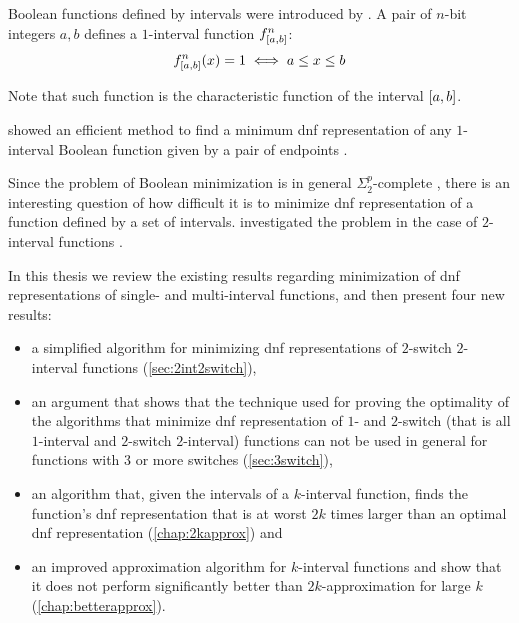 Boolean functions defined by intervals were introduced
by \citet{Schieber2005154}.
A pair of $n$-bit integers $a, b$
defines a $1$-interval function
$f^{n}_{[a, b]}$:
$$
f^{n}_{[a, b]} (x) = 1
\iff a \leq x \leq b
$$

Note that such function
is the characteristic function of the interval
$[a, b]$.

\citeauthor{Schieber2005154} showed an efficient method
to find a minimum \acrfull{dnf} representation
of any $1$-interval Boolean function
given by a pair of endpoints \citep{Schieber2005154}.

Since the problem of Boolean minimization is in general
$\Sigma_2^p$-complete \citep{Umans1998},
there is an interesting question of how difficult it is
to minimize \acrshort{dnf} representation of
a function defined by a set of intervals.
\citeauthor{Dubovsky2012} investigated the problem
in the case of $2$-interval functions
\citep{Dubovsky2012}.

In this thesis we review the existing results regarding
minimization of \acrshort{dnf} representations of
single- and multi-interval functions,
and then present four new results:

\begin{itemize}
\item a simplified algorithm
for minimizing \acrshort{dnf} representations
of $2$-switch
$2$-interval functions (\cref{sec:2int2switch}),

\item
an argument that shows
that the technique used for proving the optimality
of the algorithms that minimize
\acrshort{dnf} representation
of $1$- and $2$-switch
(that is all $1$-interval
and $2$-switch $2$-interval)
functions
can not be used in general for
functions with $3$ or more switches
(\cref{sec:3switch}),

\item
an algorithm
that,
given the intervals of a $k$-interval function,
finds the function's \acrshort{dnf} representation
that is at worst
$2k$ times larger
than an optimal \acrshort{dnf} representation
(\cref{chap:2kapprox}) and

\item
an improved approximation algorithm
for $k$-interval functions
and show that it does not perform significantly
better than $2k$-approximation for large $k$
(\cref{chap:betterapprox}).
\end{itemize}
